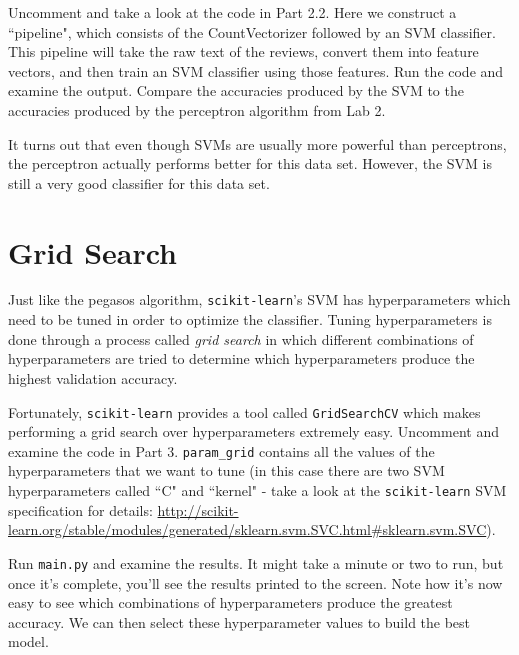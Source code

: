 \documentclass{article}
\begin{document}
Uncomment and take a look at the code in Part 2.2. Here we construct a ``pipeline", which consists of the CountVectorizer followed by an SVM classifier. This pipeline will take the raw text of the reviews, convert them into feature vectors, and then train an SVM classifier using those features. Run the code and examine the output. Compare the accuracies produced by the SVM to the accuracies produced by the perceptron algorithm from Lab 2.

It turns out that even though SVMs are usually more powerful than perceptrons, the perceptron actually performs better for this data set. However, the SVM is still a very good classifier for this data set.

\section{Grid Search}

Just like the pegasos algorithm, \texttt{scikit-learn}'s SVM has hyperparameters which need to be tuned in order to optimize the classifier. Tuning hyperparameters is done through a process called \textit{grid search} in which different combinations of hyperparameters are tried to determine which hyperparameters produce the highest validation accuracy.

Fortunately, \texttt{scikit-learn} provides a tool called \texttt{GridSearchCV} which makes performing a grid search over hyperparameters extremely easy. Uncomment and examine the code in Part 3. \texttt{param\_grid} contains all the values of the hyperparameters that we want to tune (in this case there are two SVM hyperparameters called ``C" and ``kernel" - take a look at the \texttt{scikit-learn} SVM specification for details: \url{http://scikit-learn.org/stable/modules/generated/sklearn.svm.SVC.html#sklearn.svm.SVC}).

Run \texttt{main.py} and examine the results. It might take a minute or two to run, but once it's complete, you'll see the results printed to the screen. Note how it's now easy to see which combinations of hyperparameters produce the greatest accuracy. We can then select these hyperparameter values to build the best model.
\end{document}
